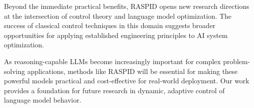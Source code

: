 \documentclass{article}
\begin{document}
Beyond the immediate practical benefits, RASPID opens new research directions at the intersection of control theory and language model optimization. The success of classical control techniques in this domain suggests broader opportunities for applying established engineering principles to AI system optimization.

As reasoning-capable LLMs become increasingly important for complex problem-solving applications, methods like RASPID will be essential for making these powerful models practical and cost-effective for real-world deployment. Our work provides a foundation for future research in dynamic, adaptive control of language model behavior.


\end{document}
